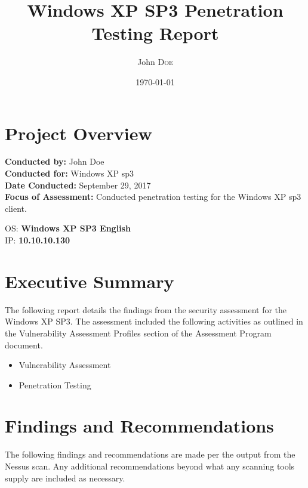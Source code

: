 \documentclass[12pt]{article}
\begin{document}
\title{Windows XP SP3 Penetration Testing Report}%
\author{John \textsc{Doe}}%
\date{\today}
\maketitle
\newpage
\tableofcontents
\newpage

\section{Project Overview}
\begin{flushleft}
\textbf{Conducted by: } John Doe\\
\vspace{4mm}
\textbf{Conducted for: } Windows XP sp3\\
\vspace{4mm}
\textbf{Date Conducted: } September 29, 2017\\
\vspace{4mm}
\textbf{Focus of Assessment: } Conducted penetration testing for the Windows XP sp3 client.
\end{flushleft}

\begin{tcolorbox}[title=Home Lab Client]
OS: \textbf{Windows XP SP3 English}\\ 
IP:  \textbf{10.10.10.130}
\end{tcolorbox}

\section{Executive Summary}
The following report details the findings from the security assessment for the Windows XP SP3. The assessment included the following activities as outlined in the Vulnerability Assessment Profiles section of the Assessment Program document.

\begin{itemize}
	\item Vulnerability Assessment 
	\item	Penetration Testing
\end{itemize}

\section{Findings and Recommendations}
The following findings and recommendations are made per the output from the Nessus scan. Any additional recommendations beyond what any scanning tools supply are included as necessary. \\





%
%
\newpage

%
\end{document}
